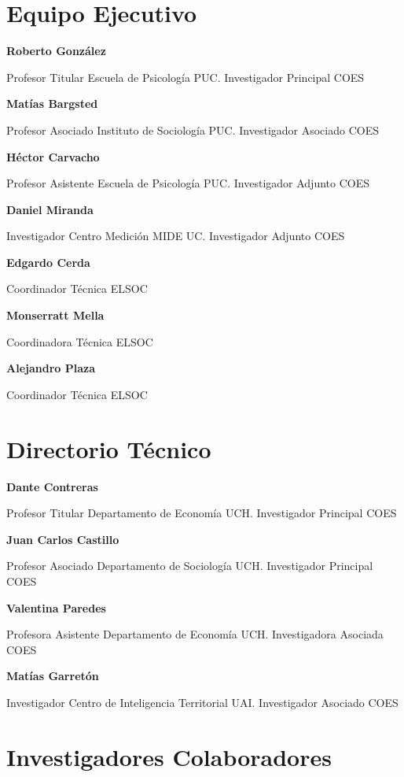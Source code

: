 \documentclass[
  12pt,
]{book}
\begin{document}
\hypertarget{equipo-ejecutivo}{%
\section{Equipo Ejecutivo}\label{equipo-ejecutivo}}

\textbf{Roberto González}

Profesor Titular Escuela de Psicología PUC. Investigador Principal COES

\textbf{Matías Bargsted}

Profesor Asociado Instituto de Sociología PUC. Investigador Asociado COES

\textbf{Héctor Carvacho}

Profesor Asistente Escuela de Psicología PUC. Investigador Adjunto COES

\textbf{Daniel Miranda}

Investigador Centro Medición MIDE UC. Investigador Adjunto COES

\textbf{Edgardo Cerda}

Coordinador Técnica ELSOC

\textbf{Monserratt Mella}

Coordinadora Técnica ELSOC

\textbf{Alejandro Plaza}

Coordinador Técnica ELSOC

\hypertarget{directorio-tuxe9cnico}{%
\section{Directorio Técnico}\label{directorio-tuxe9cnico}}

\textbf{Dante Contreras}

Profesor Titular Departamento de Economía UCH.
Investigador Principal COES

\textbf{Juan Carlos Castillo}

Profesor Asociado Departamento de Sociología UCH.
Investigador Principal COES

\textbf{Valentina Paredes}

Profesora Asistente Departamento de Economía UCH.
Investigadora Asociada COES

\textbf{Matías Garretón}

Investigador Centro de Inteligencia Territorial UAI.
Investigador Asociado COES

\hypertarget{investigadores-colaboradores}{%
\section{Investigadores Colaboradores}\label{investigadores-colaboradores}}
\end{document}
